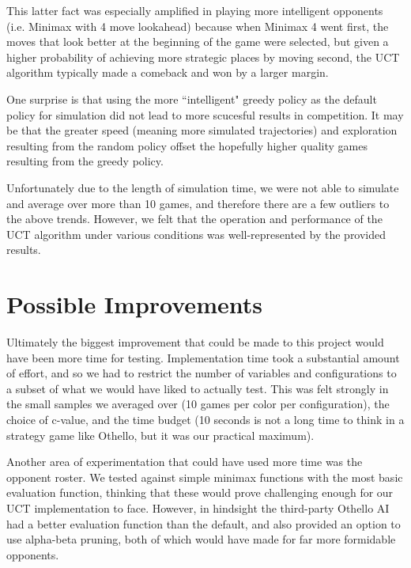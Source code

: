 \documentclass[12pt,letterpaper]{article}
\begin{document}
This latter fact was especially amplified in playing more intelligent opponents (i.e. Minimax with 4 move lookahead) because when Minimax 4 went first, the moves that look better at the beginning of the game were selected, but given a higher probability of achieving more strategic places by moving second, the UCT algorithm typically made a comeback and won by a larger margin.

One surprise is that using the more ``intelligent" greedy policy as the default policy for simulation did not lead to more scucesful results in competition. It may be that the greater speed (meaning more simulated trajectories) and exploration resulting from the random policy offset the hopefully higher quality games resulting from the greedy policy.

Unfortunately due to the length of simulation time, we were not able to simulate and average over more than 10 games, and therefore there are a few outliers to the above trends.  However, we felt that the operation and performance of the UCT algorithm under various conditions was well-represented by the provided results.

\section{Possible Improvements}
\label{impr}
Ultimately the biggest improvement that could be made to this project would have been more time for testing. Implementation time took a substantial amount of effort, and so we had to restrict the number of variables and configurations to a subset of what we would have liked to actually test. This was felt strongly in the small samples we averaged over (10 games per color per configuration), the choice of c-value, and the time budget (10 seconds is not a long time to think in a strategy game like Othello, but it was our practical maximum).

Another area of experimentation that could have used more time was the opponent roster. We tested against simple minimax functions with the most basic evaluation function, thinking that these would prove challenging enough for our UCT implementation to face. However, in hindsight the third-party Othello AI had a better evaluation function than the default, and also provided an option to use alpha-beta pruning, both of which would have made for far more formidable opponents.
\end{document}
